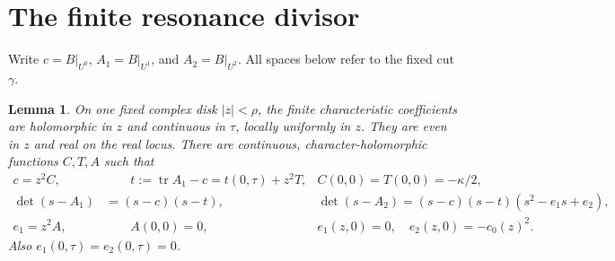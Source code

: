 \documentclass[11pt]{article}
\newtheorem{lemma}[theorem]{Lemma}
\newcommand{\tr}{\operatorname{tr}}
\begin{document}
\section{The finite resonance divisor}
Write $c=B|_{U^0}$, $A_1=B|_{U^1}$, and $A_2=B|_{U^2}$.
All spaces below refer to the fixed cut $\gamma$.

\begin{lemma}\label{coefficients}
On one fixed complex disk $|z|<\rho$, the finite characteristic
coefficients are holomorphic in $z$ and continuous in $\tau$, locally
uniformly in $z$. They are even in $z$ and real on the real locus.
There are continuous, character-holomorphic functions $C,T,A$ such that
\begin{align}
 c=z^2C,&\qquad t:=\tr A_1-c=t(0,\tau)+z^2T,
      &C(0,0)=T(0,0)=-\kappa/2,\label{factors}\\
 \det(s-A_1)&=(s-c)(s-t),&
 \det(s-A_2)=(s-c)(s-t)(s^2-e_1s+e_2),\label{polys}\\
 e_1=z^2A,&\qquad A(0,0)=0,&
 e_1(z,0)=0,\quad e_2(z,0)=-c_0(z)^2.\label{middle}
\end{align}
Also $e_1(0,\tau)=e_2(0,\tau)=0$.
\end{lemma}
\end{document}
